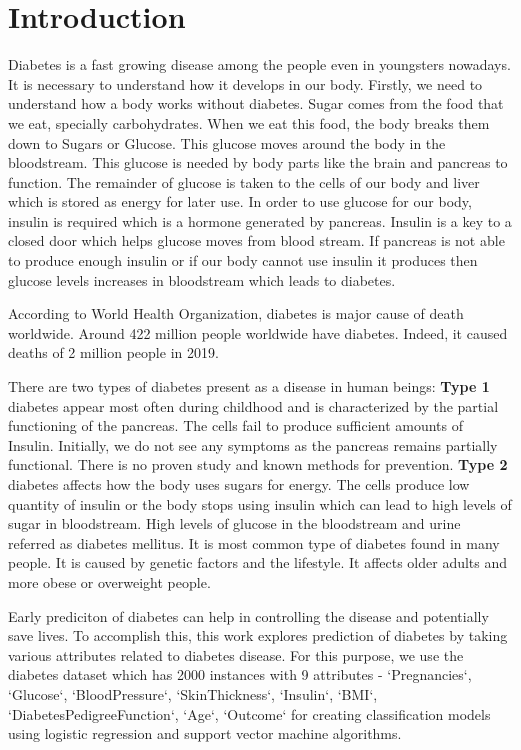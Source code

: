\chapter{Introduction}
\label{ch:into} %
Diabetes is a fast growing disease among the people even in youngsters nowadays. It is necessary to understand how it develops in our body. Firstly, we need to understand how a body works without diabetes. Sugar comes from the food that we eat, specially carbohydrates. When we eat this food, the body breaks them down to Sugars or Glucose. This glucose moves around the body in the bloodstream. This glucose is needed by body parts like the brain and pancreas to function. The remainder of glucose is taken to the cells of our body and liver which is stored as energy for later use. In order to use glucose for our body, insulin is required which is a hormone generated by pancreas. Insulin is a key to a closed door which helps glucose moves from blood stream. If pancreas is not able to produce enough insulin or if our body cannot use insulin it produces then glucose levels increases in bloodstream which leads to diabetes.

According to World Health Organization, diabetes is major cause of death worldwide. Around 422 million people worldwide have diabetes. Indeed, it caused deaths of 2 million people in 2019.

There are two types of diabetes present as a disease in human beings: \textbf{Type 1} diabetes appear most often during childhood and is characterized by the partial functioning of the pancreas. The cells fail to produce sufficient amounts of Insulin. Initially, we do not see any symptoms as the pancreas remains partially functional. There is no proven study and known methods for prevention. \textbf{Type 2} diabetes affects how the body uses sugars for energy. The cells produce low quantity of insulin or the body stops using insulin which can lead to high levels of sugar in bloodstream. High levels of glucose in the bloodstream and urine referred as diabetes mellitus. It is most common type of diabetes found in many people. It is caused by genetic factors and the lifestyle. It affects older adults and more obese or overweight people.

Early prediciton of diabetes can help in controlling the disease and potentially save lives. To accomplish this, this 
work explores prediction of diabetes by taking various attributes related to diabetes disease. For this purpose, we use the diabetes dataset \citep{dataset} which has 2000 instances with 9 attributes - `Pregnancies`, `Glucose`, `BloodPressure`, `SkinThickness`, `Insulin`, `BMI`, `DiabetesPedigreeFunction`, `Age`, `Outcome` for creating classification models using logistic regression and support vector machine algorithms.




